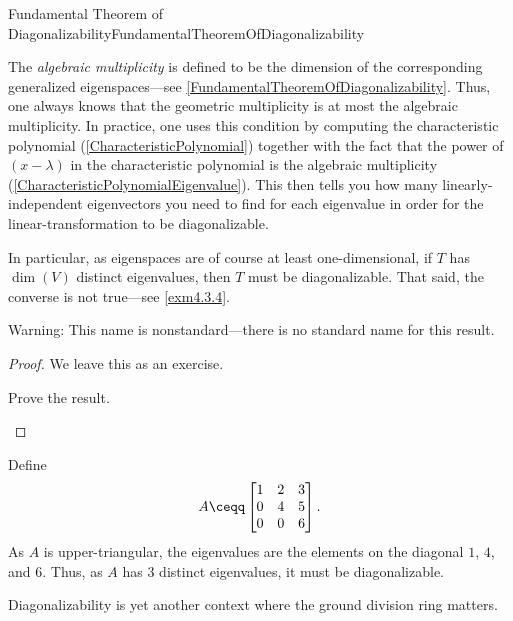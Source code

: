\begin{thm}{Fundamental Theorem of Diagonalizability}{FundamentalTheoremOfDiagonalizability}
\begin{rmk}
		The \emph{algebraic multiplicity} is defined to be the dimension of the corresponding generalized eigenspaces---see \cref{FundamentalTheoremOfDiagonalizability}.  Thus, one always knows that the geometric multiplicity is at most the algebraic multiplicity.  In practice, one uses this condition by computing the characteristic polynomial (\cref{CharacteristicPolynomial}) together with the fact that the power of $(x-\lambda )$ in the characteristic polynomial is the algebraic multiplicity (\cref{CharacteristicPolynomialEigenvalue}).  This then tells you how many linearly-independent eigenvectors you need to find for each eigenvalue in order for the linear-transformation to be diagonalizable.
	\end{rmk}
	\begin{rmk}
		In particular, as eigenspaces are of course at least one-dimensional, if $T$ has $\dim (V)$ distinct eigenvalues, then $T$ must be diagonalizable.  That said, the converse is not true---see \cref{exm4.3.4}.
	\end{rmk}
	\begin{rmk}
		Warning:  This name is nonstandard---there is no standard name for this result.
	\end{rmk}
	\begin{proof}
		We leave this as an exercise.
		\begin{exr}[breakable=false]{}{}
			Prove the result.
		\end{exr}
	\end{proof}
\end{thm}
\begin{exm}{}{}
	Define
	\begin{equation}
		A\ceqq \begin{bmatrix}1 & 2 & 3 \\ 0 & 4 & 5 \\ 0 & 0 & 6\end{bmatrix}.
	\end{equation}
	As $A$ is upper-triangular, the eigenvalues are the elements on the diagonal  $1$, $4$, and $6$.  Thus, as $A$ has $3$ distinct eigenvalues, it must be diagonalizable.
\end{exm}
Diagonalizability is yet another context where the ground division ring matters.
